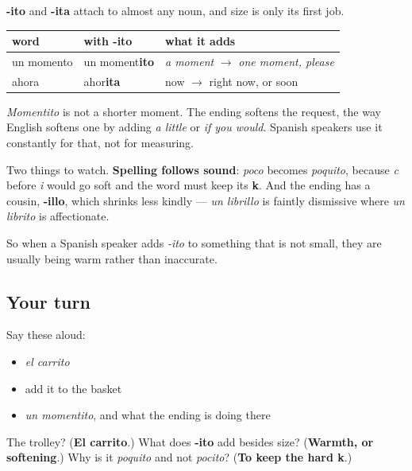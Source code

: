 \begin{grammarlens}[title={Grammar Lens: the ending that does more than shrink}]
\textbf{-ito} and \textbf{-ita} attach to almost any noun, and size is only its first job.

\noindent
\begin{tabularx}{\linewidth}{@{}>{\raggedright\arraybackslash}X>{\raggedright\arraybackslash}X>{\raggedright\arraybackslash}X@{}}
\toprule
\textbf{word} & \textbf{with -ito} & \textbf{what it adds} \\
\midrule
un momento & un moment\textbf{ito} & \emph{a moment} $\to$ \emph{one moment, please} \\
ahora & ahor\textbf{ita} & now $\to$ right now, or soon \\
\bottomrule
\end{tabularx}

\emph{Momentito} is not a shorter moment. The ending softens the request, the way English softens one by adding \emph{a little} or \emph{if you would}. Spanish speakers use it constantly for that, not for measuring.

Two things to watch. \textbf{Spelling follows sound}: \emph{poco} becomes \emph{poquito}, because \emph{c} before \emph{i} would go soft and the word must keep its \textbf{k}. And the ending has a cousin, \textbf{-illo}, which shrinks less kindly — \emph{un librillo} is faintly dismissive where \emph{un librito} is affectionate.

So when a Spanish speaker adds \emph{-ito} to something that is not small, they are usually being warm rather than inaccurate.
\end{grammarlens}

\subsection*{Your turn}
Say these aloud:

\begin{itemize}
\raggedright
  \item \emph{el carrito}
  \item add it to the basket
  \item \emph{un momentito}, and what the ending is doing there
\end{itemize}

\begin{tcolorbox}[breakable,colback=teal!4,colframe=teal!35!black,title={Before you move on}]
The trolley? (\textbf{El carrito}.) What does \textbf{-ito} add besides size? (\textbf{Warmth, or softening}.) Why is it \emph{poquito} and not \emph{pocito}? (\textbf{To keep the hard k}.)
\end{tcolorbox}
